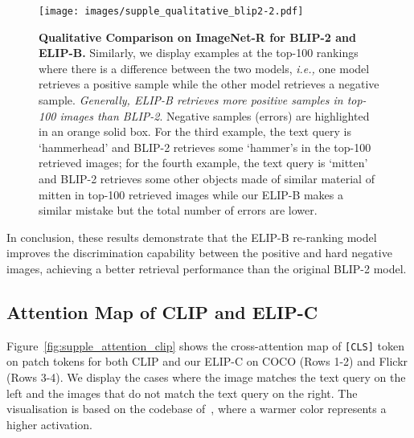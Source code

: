 \begin{figure*}[h]
	\centering
\texttt{[image: images/supple\_qualitative\_blip2-2.pdf]}
	\caption{
\textbf{Qualitative Comparison on ImageNet-R for BLIP-2 and ELIP-B.} Similarly, we display examples at the top-100 rankings where there is a difference between the two models, \emph{i.e.,} one model retrieves a positive sample while the other model retrieves a negative sample. \emph{Generally, ELIP-B retrieves more positive samples in top-100 images than BLIP-2}. Negative samples (errors) are highlighted in an orange solid box. 
For the third example, the text query is `hammerhead' and BLIP-2 retrieves some `hammer's in the top-100 retrieved images; for the fourth example, the text query is `mitten' and BLIP-2 retrieves some other objects made of similar material of mitten in top-100 retrieved images while our ELIP-B makes a similar mistake but the total number of errors are lower. 
	} 
	\label{fig:supple_qualitative_blip2-2}
	\end{figure*}


\clearpage
In conclusion, these results demonstrate that the ELIP-B re-ranking model improves the discrimination capability between the positive and hard negative images, achieving a better retrieval performance than the original BLIP-2 model.

    





    

    
\clearpage
\subsection{Attention Map of CLIP and ELIP-C}


Figure~\ref{fig:supple_attention_clip} shows the cross-attention map of \texttt{[CLS]} token on patch tokens for both CLIP and our ELIP-C on COCO (Rows 1-2) and Flickr (Rows 3-4). We display the cases where the image matches the text query on the left and the images that do not match the text query on the right. The visualisation is based on the codebase of~\cite{selvaraju2017grad}, where a warmer color represents a higher activation.



